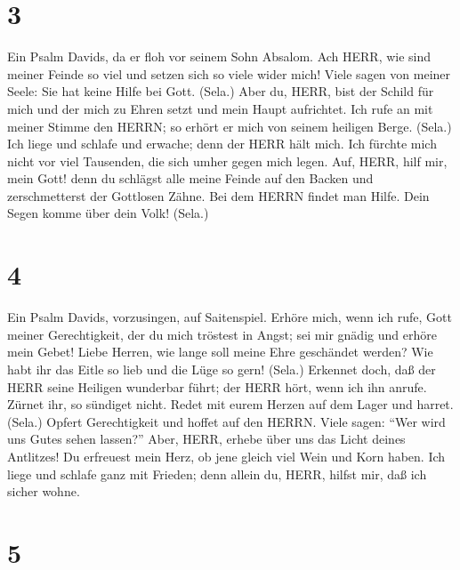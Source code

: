 \hypertarget{section-2}{%
\section{3}\label{section-2}}

 Ein Psalm Davids, da er floh vor seinem Sohn Absalom. Ach
HERR, wie sind meiner Feinde so viel und setzen sich so viele wider
mich!  Viele sagen von meiner Seele: Sie hat keine Hilfe bei
Gott. (Sela.)  Aber du, HERR, bist der Schild für mich und
der mich zu Ehren setzt und mein Haupt aufrichtet.  Ich rufe
an mit meiner Stimme den HERRN; so erhört er mich von seinem heiligen
Berge. (Sela.)  Ich liege und schlafe und erwache; denn der
HERR hält mich.  Ich fürchte mich nicht vor viel Tausenden,
die sich umher gegen mich legen.  Auf, HERR, hilf mir, mein
Gott! denn du schlägst alle meine Feinde auf den Backen und
zerschmetterst der Gottlosen Zähne.  Bei dem HERRN findet
man Hilfe. Dein Segen komme über dein Volk! (Sela.)

\hypertarget{section-3}{%
\section{4}\label{section-3}}

 Ein Psalm Davids, vorzusingen, auf Saitenspiel. Erhöre
mich, wenn ich rufe, Gott meiner Gerechtigkeit, der du mich tröstest in
Angst; sei mir gnädig und erhöre mein Gebet!  Liebe Herren,
wie lange soll meine Ehre geschändet werden? Wie habt ihr das Eitle so
lieb und die Lüge so gern! (Sela.)  Erkennet doch, daß der
HERR seine Heiligen wunderbar führt; der HERR hört, wenn ich ihn anrufe.
 Zürnet ihr, so sündiget nicht. Redet mit eurem Herzen auf
dem Lager und harret. (Sela.)  Opfert Gerechtigkeit und
hoffet auf den HERRN.  Viele sagen: ``Wer wird uns Gutes
sehen lassen?'' Aber, HERR, erhebe über uns das Licht deines Antlitzes!
 Du erfreuest mein Herz, ob jene gleich viel Wein und Korn
haben.  Ich liege und schlafe ganz mit Frieden; denn allein
du, HERR, hilfst mir, daß ich sicher wohne.

\hypertarget{section-4}{%
\section{5}\label{section-4}}

